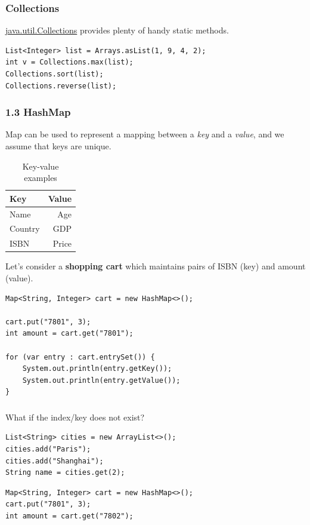 \documentclass[aspectratio=169, 14pt]{beamer}
\begin{document}
\begin{frame}[fragile]
    \frametitle{Collections}
    \href{https://docs.oracle.com/en/java/javase/11/docs/api/java.base/java/util/Collections.html}{java.util.Collections} provides plenty of handy static methods.

\begin{verbatim}
List<Integer> list = Arrays.asList(1, 9, 4, 2);
int v = Collections.max(list); 
Collections.sort(list);  
Collections.reverse(list);
\end{verbatim}
\end{frame}


\begin{frame}
    \frametitle{1.3 HashMap}
    \alert{Map} can be used to represent a mapping between a \emph{key} and a \emph{value}, and we assume that keys are unique.
    \begin{table}
        \caption{Key-value examples}
        \begin{tabular}{lr}
          \toprule
          Key & Value\\
          \midrule
          Name & Age\\
          Country & GDP\\
          ISBN & Price \\
          \bottomrule
        \end{tabular}
    \end{table}
\end{frame}

\begin{frame}[fragile]
    Let's consider a \textbf{shopping cart} which maintains pairs of ISBN (key) and amount (value).

    \begin{verbatim}
Map<String, Integer> cart = new HashMap<>();

cart.put("7801", 3);
int amount = cart.get("7801");

for (var entry : cart.entrySet()) {
    System.out.println(entry.getKey());
    System.out.println(entry.getValue());
}
    \end{verbatim}
\end{frame}

\begin{frame}[fragile]
    \frametitle{}
    What if the index/key does not exist?    
    \begin{verbatim}
List<String> cities = new ArrayList<>();
cities.add("Paris");
cities.add("Shanghai");
String name = cities.get(2);
    \end{verbatim}

    \begin{verbatim}
Map<String, Integer> cart = new HashMap<>();
cart.put("7801", 3);
int amount = cart.get("7802");
    \end{verbatim}  
\end{frame}
\end{document}

